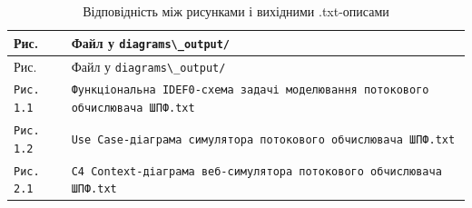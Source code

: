 \documentclass[
]{article}
\newcommand{\passthrough}[1]{#1}
\begin{document}
\begin{longtable}[]{@{}
  >{\raggedright\arraybackslash}p{}
  >{\raggedright\arraybackslash}p{}@{}}
\caption[Відповідність між рисунками і вихідними
.txt-описами]{Відповідність між рисунками і вихідними
.txt-описами}\tabularnewline
\toprule\noalign{}
\begin{minipage}[b]{\linewidth}\raggedright
Рис.
\end{minipage} & \begin{minipage}[b]{\linewidth}\raggedright
Файл у
\passthrough{\lstinline!diagrams\_output!}\passthrough{\lstinline!/!}
\end{minipage} \\
\midrule\noalign{}
\endfirsthead
\toprule\noalign{}
\begin{minipage}[b]{\linewidth}\raggedright
Рис.
\end{minipage} & \begin{minipage}[b]{\linewidth}\raggedright
Файл у
\passthrough{\lstinline!diagrams\_output!}\passthrough{\lstinline!/!}
\end{minipage} \\
\midrule\noalign{}
\endhead
\bottomrule\noalign{}
\endlastfoot
\passthrough{\lstinline!Рис. 1.1!} &
\passthrough{\lstinline!Функціональна!}\passthrough{\lstinline! !}\passthrough{\lstinline!IDEF!}\passthrough{\lstinline!0-схема!}\passthrough{\lstinline! !}\passthrough{\lstinline!задачі!}\passthrough{\lstinline! !}\passthrough{\lstinline!моделювання!}\passthrough{\lstinline! !}\passthrough{\lstinline!потокового!}\passthrough{\lstinline! !}\passthrough{\lstinline!обчислювача!}\passthrough{\lstinline! !}\passthrough{\lstinline!ШПФ.!}\passthrough{\lstinline!txt!} \\
\passthrough{\lstinline!Рис. 1.2!} &
\passthrough{\lstinline!Use!}\passthrough{\lstinline! !}\passthrough{\lstinline!Case!}\passthrough{\lstinline!-діаграма!}\passthrough{\lstinline! !}\passthrough{\lstinline!симулятора!}\passthrough{\lstinline! !}\passthrough{\lstinline!потокового!}\passthrough{\lstinline! !}\passthrough{\lstinline!обчислювача!}\passthrough{\lstinline! !}\passthrough{\lstinline!ШПФ.!}\passthrough{\lstinline!txt!} \\
\passthrough{\lstinline!Рис. 2.1!} &
\passthrough{\lstinline!C!}\passthrough{\lstinline!4!}\passthrough{\lstinline! !}\passthrough{\lstinline!Context!}\passthrough{\lstinline!-діаграма!}\passthrough{\lstinline! !}\passthrough{\lstinline!веб-симулятора!}\passthrough{\lstinline! !}\passthrough{\lstinline!потокового!}\passthrough{\lstinline! !}\passthrough{\lstinline!обчислювача!}\passthrough{\lstinline! !}\passthrough{\lstinline!ШПФ.!}\passthrough{\lstinline!txt!} \\

\end{longtable}
\end{document}
